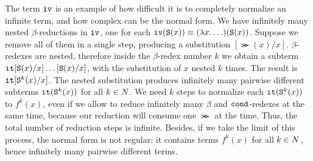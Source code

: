 The term ${\tt iv}$ is an example of how difficult it is to completely normalize
an infinite term, and how complex can be the normal form. 
We have infinitely many nested $\beta$-reductions in
${\tt iv}$, one for each ${\tt iv}({\tt S} (x)) \equiv (\lambda x.\ldots)({\tt S} (x))$. 
Suppose we remove all of them in a single step, producing a substitution
$[\Succ (x)/x]$. $\beta$-redexes are nested, therefore 
inside the $\beta$-redex number $k$ we obtain a subterm ${\tt it}[{\tt S} (x)/x]
\ldots[{\tt S} (x)/x]$, with the substitution of $x$ nested $k$ times. 
The result is ${\tt it}[{\tt S} ^k(x)/x]$.
The nested substitution produces infinitely many pairwise different subterms 
${\tt it}({\tt S} ^k(x))$ for all $k \in {N}$. 
We need $k$ steps to normalize each ${\tt it}({\tt S} ^k(x))$ to $f^k(x)$, 
even if we allow to reduce infinitely many 
$\beta$ and ${\tt cond}$-redexes at the same time, because our reduction will consume one 
$\Succ$ at the time. Thus, the total number of reduction steps is infinite. 
Besides, if we take the limit of this process, the normal form is not regular: it contains terms 
$f^k(x)$ for all $k \in {N}$, hence infinitely many pairwise different terms. 




